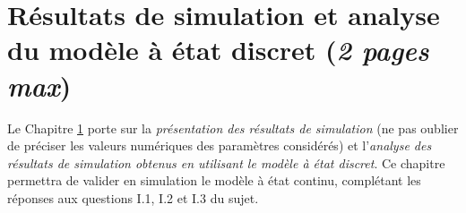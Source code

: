 \chapter{Résultats de simulation et analyse du modèle à état discret (\textit{2 pages max})}
\label{ch:simu}


Le Chapitre \ref{ch:simu} porte sur la \textit{présentation des résultats de simulation} (ne pas oublier de préciser les valeurs numériques des paramètres considérés) et l’\textit{analyse des résultats de simulation obtenus en utilisant le modèle à état discret}.
Ce chapitre permettra de valider en simulation le modèle à état continu, complétant les réponses aux questions I.1, I.2 et I.3 du sujet.
